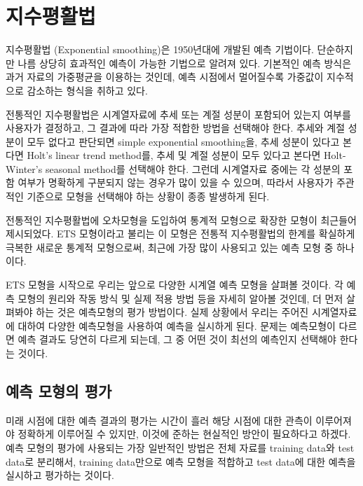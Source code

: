 \documentclass[
]{book}
\begin{document}
\hypertarget{uxc9c0uxc218uxd3c9uxd65cuxbc95}{%
\chapter{지수평활법}\label{uxc9c0uxc218uxd3c9uxd65cuxbc95}}

지수평활법 (Exponential smoothing)은 1950년대에 개발된 예측 기법이다. 단순하지만 나름 상당히 효과적인 예측이 가능한 기법으로 알려져 있다. 기본적인 예측 방식은 과거 자료의 가중평균을 이용하는 것인데, 예측 시점에서 멀어질수록 가중값이 지수적으로 감소하는 형식을 취하고 있다.

전통적인 지수평활법은 시계열자료에 추세 또는 계절 성분이 포함되어 있는지 여부를 사용자가 결정하고, 그 결과에 따라 가장 적합한 방법을 선택해야 한다. 추세와 계절 성분이 모두 없다고 판단되면 simple exponential smoothing을, 추세 성분이 있다고 본다면 Holt's linear trend method를, 추세 및 계절 성분이 모두 있다고 본다면 Holt-Winter's seasonal method를 선택해야 한다. 그런데 시계열자료 중에는 각 성분의 포함 여부가 명확하게 구분되지 않는 경우가 많이 있을 수 있으며, 따라서 사용자가 주관적인 기준으로 모형을 선택해야 하는 상황이 종종 발생하게 된다.

전통적인 지수평활법에 오차모형을 도입하여 통계적 모형으로 확장한 모형이 최근들어 제시되었다. ETS 모형이라고 불리는 이 모형은 전통적 지수평활법의 한계를 확실하게 극복한 새로운 통계적 모형으로써, 최근에 가장 많이 사용되고 있는 예측 모형 중 하나이다.

ETS 모형을 시작으로 우리는 앞으로 다양한 시계열 예측 모형을 살펴볼 것이다. 각 예측 모형의 원리와 작동 방식 및 실제 적용 방법 등을 자세히 알아볼 것인데, 더 먼저 살펴봐야 하는 것은 예측모형의 평가 방법이다. 실제 상황에서 우리는 주어진 시계열자료에 대하여 다양한 예측모형을 사용하여 예측을 실시하게 된다. 문제는 예측모형이 다르면 예측 결과도 당연히 다르게 되는데, 그 중 어떤 것이 최선의 예측인지 선택해야 한다는 것이다.

\hypertarget{uxc608uxce21-uxbaa8uxd615uxc758-uxd3c9uxac00}{%
\section{예측 모형의 평가}\label{uxc608uxce21-uxbaa8uxd615uxc758-uxd3c9uxac00}}

미래 시점에 대한 예측 결과의 평가는 시간이 흘러 해당 시점에 대한 관측이 이루어져야 정확하게 이루어질 수 있지만, 이것에 준하는 현실적인 방안이 필요하다고 하겠다. 예측 모형의 평가에 사용되는 가장 일반적인 방법은 전체 자료를 training data와 test data로 분리해서, training data만으로 예측 모형을 적합하고 test data에 대한 예측을 실시하고 평가하는 것이다.
\end{document}
